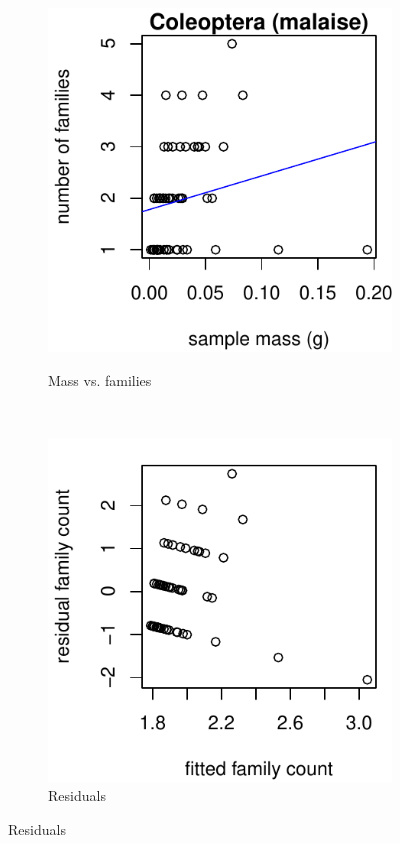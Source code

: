 \documentclass[10pt,letterpaper,twocolumn]{article}
\begin{document}
\begin{figure}[h]
	\centering
	\begin{subfigure}[b]{0.15\textwidth}
		\caption{Mass vs. families}
		\includegraphics[width=\textwidth]{plots/mass-vs-count/scatter/2015_malaise_Coleoptera_mass-vs-count.pdf}
		\label{fig:malaise_coleoptera_scatter}
	\end{subfigure}
	~
	\begin{subfigure}[b]{0.15\textwidth}
		\caption{Residuals}
		\includegraphics[width=\textwidth]{plots/mass-vs-count/residual/2015_malaise_Coleoptera_residual.pdf}

\end{subfigure}
\end{figure}
\end{document}
